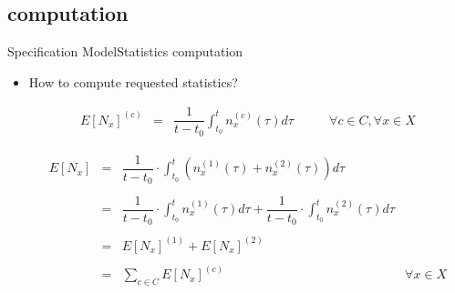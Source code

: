 \documentclass[10pt]{beamer}
\begin{document}

\subsection{computation}
\begin{frame}{Specification Model}{Statistics computation}

\begin{itemize}
\item How to compute requested statistics?


\begin{equation}
\begin{array} {rclr} 
E[N_x]^{(c)} & = & \displaystyle  \dfrac{1}{t-t_0}\int_{t_0}^t n_x^{(c)}(\tau)d\tau & \qquad \forall c \in C, \forall x \in X
\end{array}
\end{equation}

\begin{equation}
\begin{array} {rclr} 
E[N_x] & = & \displaystyle  \dfrac{1}{t-t_0} \cdot \int_{t_0}^t \left( n_x^{(1)}(\tau) + n_x^{(2)}(\tau) \right) d\tau \\\\
	   & = & \displaystyle  \dfrac{1}{t-t_0} \cdot \int_{t_0}^t n_x^{(1)}(\tau)d\tau + \dfrac{1}{t-t_0} \cdot \int_{t_0}^t n_x^{(2)}(\tau)d\tau \\\\
	   & = & E[N_x]^{(1)} + E[N_x]^{(2)} \\\\
	   & = & \displaystyle  \sum_{c \in C} E[N_x]^{(c)} & \forall x \in X
\end{array}
\end{equation}

\end{itemize}
\end{frame}
\end{document}
